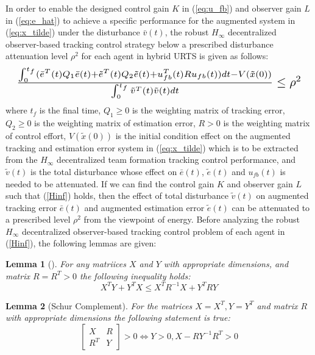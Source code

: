 \documentclass[journal,12pt,onecolumn,draftclsnofoot,]{IEEEtran}
\newtheorem{lemma}{Lemma}
\begin{document}
In order to enable the designed control gain $K$ in (\ref{eq:u_fb}) and observer gain $L$ in (\ref{eq:e_hat}) to achieve a specific performance for the augmented system in (\ref{eq:x_tilde}) under the disturbance $\bar{v}(t)$, the robust $H_\infty$ decentralized observer-based tracking control strategy below a prescribed disturbance attenuation level $\rho^2$ for each agent in hybrid URTS is given as follows:
\begin{equation} \label{Hinf}
    \resizebox{1\hsize}{!}{    
        $\frac{\int_{0}^{t_f}(\bar{e}^T(t)Q_1\bar{e}(t) + \tilde{e}^T(t)Q_2\tilde{e}(t) + u_{fb}^T(t)Ru_{fb}(t))dt - V(\tilde{x}(0))}{\int_{0}^{t_f}\tilde{v}^T(t)\tilde{v}(t)dt}\leq \rho^2$
    }
\end{equation}
where $t_f$ is the final time, $Q_1 \geq 0$ is the weighting matrix of tracking error, $Q_2 \geq 0$ is the weighting matrix of estimation error, $R > 0$ is the weighting matrix of control effort, $V(\tilde{x}(0))$ is the initial condition effect on the augmented tracking and estimation error system in (\ref{eq:x_tilde}) which is to be extracted from the $H_\infty$ decentralized team formation tracking control performance, and $\tilde{v}(t)$ is the total disturbance whose effect on $\bar{e}(t)$, $\tilde{e}(t)$ and $u_{fb}(t)$ is needed to be attenuated. If we can find the control gain $K$ and observer gain $L$ such that (\ref{Hinf}) holds, then the effect of total disturbance $\tilde{v}(t)$ on augmented tracking error $\bar{e}(t)$ and augmented estimation error $\tilde{e}(t)$ can be attenuated to a prescribed level $\rho^2$ from the viewpoint of energy. Before analyzing the robust $H_\infty$ decentralized observer-based tracking control problem of each agent in (\ref{Hinf}), the following lemmas are given:
\begin{lemma}[\cite{boyd1994linear}] \label{lemma1}
    For any matriices $X$ and $Y$ with appropriate dimensions, and matrix $R=R^T>0$ the following inequality holds:
    \begin{equation} \label{}
        X^T Y + Y^T X \leq X^T R^{-1}X + Y^T R Y
    \end{equation}  
\end{lemma}
\begin{lemma}[Schur Complement\cite{boyd1994linear}] \label{lemma2}
    For the matrices $X=X^T,Y=Y^T$ and matrix $R$ with appropriate dimensions the following statement is true:
    \begin{equation} \label{}
        \begin{bmatrix}
            X & R \\ R^T & Y 
        \end{bmatrix} > 0 \Leftrightarrow Y>0, X-RY^{-1}R^T>0
    \end{equation}
\end{lemma}
\end{document}
